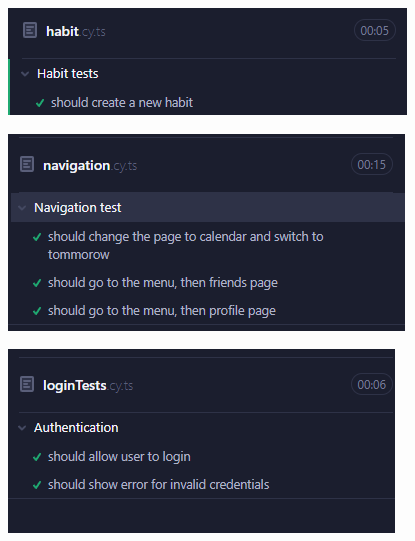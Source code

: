 \documentclass[12pt]{report}
\begin{document}
\begin{figure}[H]
    \centering
    \begin{minipage}[b]{0.3\textwidth}
        \centering
        \includegraphics[width=\linewidth]{src/habittest.png}
        \label{fig:img1}
    \end{minipage}
    \hspace{0.03\textwidth}
    \begin{minipage}[b]{0.3\textwidth}
        \centering
        \includegraphics[width=\linewidth]{src/navigationtest.png}
        \label{fig:img2}
    \end{minipage}
    \hspace{0.03\textwidth}
    \begin{minipage}[b]{0.3\textwidth}
        \centering
        \includegraphics[width=\linewidth]{src/logintest.png}
        \label{fig:img3}
    \end{minipage}
\end{figure}
\end{document}
